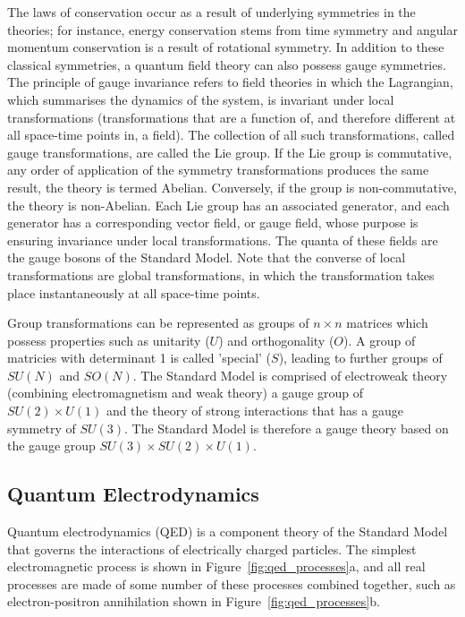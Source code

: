 The laws of conservation occur as a result of underlying symmetries in the theories; for instance, energy
conservation stems from time symmetry and angular momentum conservation is a result of rotational symmetry.
In addition to these classical symmetries, a quantum field theory can also possess gauge symmetries. The
principle of gauge invariance refers to field theories in which the Lagrangian, which summarises the dynamics
of the system, is invariant under local transformations (transformations that are a function of, and therefore
different at all space-time points in, a field). The collection of all such transformations, called gauge
transformations, are called the Lie group. If the Lie group is commutative, \ie any order of application of
the symmetry transformations produces the same result, the theory is termed Abelian. Conversely, if the group
is non-commutative, the theory is non-Abelian. Each Lie group has an associated generator, and each generator
has a corresponding vector field, or gauge field, whose purpose is ensuring invariance under local
transformations. The quanta of these fields are the gauge bosons of the Standard Model. Note that the converse
of local transformations are global transformations, in which the transformation takes place instantaneously
at all space-time points.

Group transformations can be represented as groups of $n \times n$ matrices which possess properties such as
unitarity ($U$) and orthogonality ($O$). A group of matricies with determinant 1 is called 'special' ($S$),
leading to further groups of $SU(N)$ and $SO(N)$. The Standard Model is comprised of electroweak theory
(combining electromagnetism and weak theory) a gauge group of $SU(2) \times U(1)$ and the theory of strong
interactions that has a gauge symmetry of $SU(3)$. The Standard Model is therefore a gauge theory based on the
gauge group $SU(3) \times SU(2) \times U(1)$.

\subsection{Quantum Electrodynamics}
\label{ss:quantum_electrodynamics}

Quantum electrodynamics (QED) is a component theory of the Standard Model that governs the interactions of
electrically charged particles. The simplest electromagnetic process is shown in
Figure~\ref{fig:qed_processes}a, and all real processes are made of some number of these processes combined
together, such as electron-positron annihilation shown in Figure~\ref{fig:qed_processes}b.

